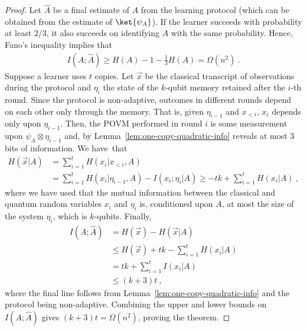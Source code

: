 \documentclass[11pt]{article}
\begin{document}
\begin{proof}
    Let $\hat{A}$ be a final estimate of $A$ from the learning protocol (which can be obtained from the estimate of $\ket{\psi_A}$). If the learner succeeds with probability at least $2/3$, it also succeeds on identifying $A$ with the same probability. Hence, Fano's inequality implies that
    \begin{align}
        I(A;\hat{A}) \geq H(A) - 1-\frac{1}{3}H(A) = \Omega(n^2)\ .
    \end{align}
        Suppose a learner uses $t$ copies. Let $\vec{x}$ be the classical transcript of observations during the protocol and $\eta_i$ the state of the $k$-qubit memory retained after the $i$-th round. Since the protocol is non-adaptive, outcomes in different rounds depend on each other only through the memory. That is, given $\eta_{i-1}$ and $x_{<i}$, $x_i$ depends only upon $\eta_{i-1}$. Then, the POVM performed in round $i$ is some measurement upon $\psi_A \otimes \eta_{i-1}$ and, by Lemma~\ref{lem:one-copy-quadratic-info} reveals at most $3$ bits of information. We have~that
    \begin{align}
        H(\vec{x}\vert A ) & = \sum_{i=1}^t H(x_i \vert x_{<i}, A)\\
        & = \sum_{i=1}^t H(x_i \vert \eta_{i-1}, A) - I(x_i; \eta_i \vert A) \geq -tk + \sum_{i=1}^t H(x_i \vert  A)\ ,
    \end{align}
    where we have used that the mutual information between the classical and quantum random variables $x_i$ and $\eta_i$ is, conditioned upon $A$, at most the size of the system $\eta_i$, which is $k$-qubits. Finally,
    \begin{align}
        I(A;\hat{A}) & = H(\vec{x}) - H(\vec{x} \vert A)\\
        & \leq H(\vec{x}) + tk - \sum_{i=1}^t H(x_i\vert A)\\
        & = tk + \sum_{i=1}^t I(x_i \vert A)\\
        & \leq (k+3)t\ ,
    \end{align}
    where the final line follows from Lemma~\ref{lem:one-copy-quadratic-info} and the protocol being non-adaptive.     Combining the upper and lower bounds on $I(A;\hat{A})$ gives $(k+3) t = \Omega(n^2)$, proving the theorem.
\end{proof}







\appendix
\end{document}
